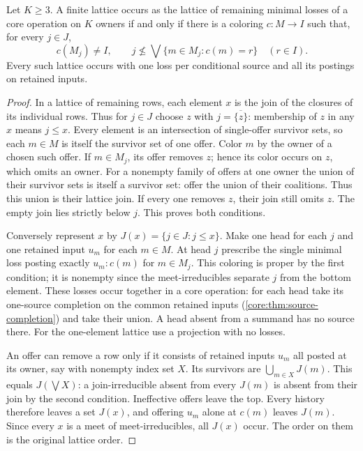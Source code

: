 \begin{theorem}
\label{core:thm:offer-lattice}
Let $K\ge3$. A finite lattice occurs as the lattice of remaining
minimal losses of a core operation on $K$ owners if and only if there
is a coloring $c:M\to I$ such that, for every $j\in J$,
\[
 c(M_j)\ne I,\qquad
 j\nleq\bigvee\{m\in M_j:c(m)=r\}\quad(r\in I).
\]
Every such lattice occurs with one loss per conditional source and
all its postings on retained inputs.
\end{theorem}
\begin{proof}
In a lattice of remaining rows, each element $x$ is the join of the
closures of its individual rows. Thus for $j\in J$ choose $z$ with
$j=\overline{\{z\}}$: membership of $z$ in any $x$ means $j\le x$.
Every element is an intersection of single-offer survivor sets, so each
$m\in M$ is itself the survivor set of one offer. Color $m$ by the
owner of a chosen such offer. If $m\in M_j$, its offer removes $z$;
hence its color occurs on $z$, which omits an owner. For a nonempty
family of offers at one owner the union of their survivor sets is
itself a survivor set: offer the union of their coalitions. Thus this
union is their lattice join. If every one removes $z$, their join
still omits $z$. The empty join lies strictly below $j$. This proves
both conditions.

Conversely represent $x$ by $J(x)=\{j\in J:j\le x\}$. Make one
head for each $j$ and one retained input $u_m$ for each $m\in M$.
At head $j$ prescribe the single minimal loss posting exactly
$u_m:c(m)$ for $m\in M_j$. This coloring is proper by the first
condition; it is nonempty since the meet-irreducibles separate $j$
from the bottom element. These losses occur together in a core
operation: for each head take its one-source completion on the common
retained inputs (\cref{core:thm:source-completion}) and take their
union. A head absent from a summand has no source there. For the
one-element lattice use a projection with no losses.

An offer can remove a row only if it consists of retained inputs
$u_m$ all posted at its owner, say with nonempty index set $X$. Its
survivors are $\bigcup_{m\in X}J(m)$. This equals $J(\bigvee X)$:
a join-irreducible absent from every $J(m)$ is absent from their join
by the second condition. Ineffective offers leave the top. Every
history therefore leaves a set $J(x)$, and offering $u_m$ alone at
$c(m)$ leaves $J(m)$. Since every $x$ is a meet of meet-irreducibles,
all $J(x)$ occur. The order on them is the original lattice order.
\end{proof}

